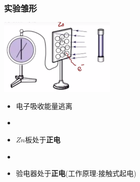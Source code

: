 \documentclass{article}
\begin{document}
\vspace{2em}

\subsubsection{实验雏形}
\begin{minipage}{0.5\textwidth}
    \includegraphics[width=15em,keepaspectratio]{./pictures/10.png}
\end{minipage}
\hspace{-5em}
\begin{minipage}{0.5\textwidth}
    \begin{itemize}
        \item 电子吸收能量逃离
        \item[]
        \item $Zn$板处于\textbf{正电}
        \item[]
        \item 验电器处于\textbf{正电}(工作原理:接触式起电)
    \end{itemize}
\end{minipage}

\vspace{2em}
\end{document}
